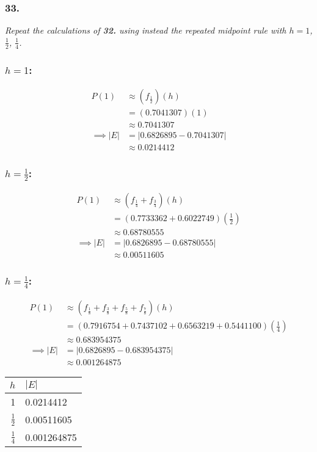 \documentclass[12pt]{article}
\begin{document}
\subsubsection*{33.}
{\it Repeat the calculations of {\bf 32.} using instead the repeated midpoint rule with $h = 1$, $\frac{1}{2}$, $\frac{1}{4}$.} \\

\subsubsection*{$h = 1$:}
\begin{align*}
	P(1) &\approx (f_{\frac{1}{2}})(h) \\
	&= (0.7041307)(1) \\
	&\approx 0.7041307 \\
	\implies |E| &= |0.6826895 - 0.7041307| \\
	&\approx 0.0214412
\end{align*}
\subsubsection*{$h = \frac{1}{2}$:}
\begin{align*}
	P(1) &\approx (f_{\frac{1}{4}} + f_{\frac{3}{4}})(h) \\
	&= (0.7733362 + 0.6022749)(\textstyle\frac{1}{2}) \\
	&\approx 0.68780555 \\
	\implies |E| &= |0.6826895 - 0.68780555| \\
	&\approx 0.00511605
\end{align*}
\subsubsection*{$h = \frac{1}{4}$:}
\begin{align*}
	P(1) &\approx (f_{\frac{1}{8}} + f_{\frac{3}{8}} + f_{\frac{5}{8}} + f_{\frac{7}{8}})(h) \\
	&= (0.7916754 + 0.7437102 + 0.6563219 + 0.5441100)(\textstyle\frac{1}{4}) \\
	&\approx 0.683954375 \\
	\implies |E| &= |0.6826895 - 0.683954375| \\
	&\approx 0.001264875
\end{align*}
\begin{table}[H]
	\begin{tabular}{|r|l|}\hline
		$h$ & $|E|$ \\ \hline
		1 & 0.0214412 \\
		$\frac{1}{2}$ & 0.00511605 \\
		$\frac{1}{4}$ & 0.001264875 \\ \hline
	\end{tabular}
\end{table}
\end{document}
